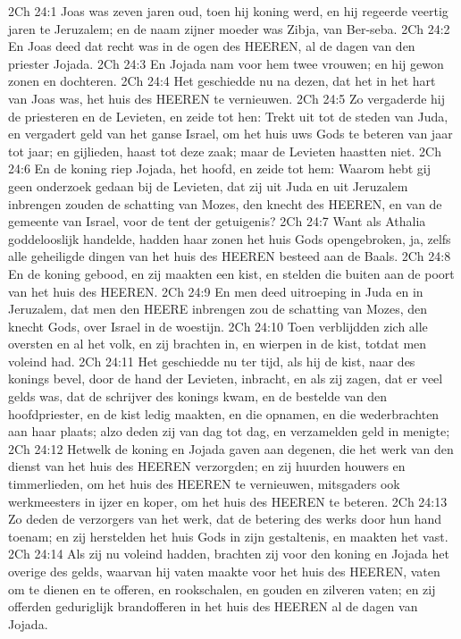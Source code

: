 2Ch 24:1  Joas was zeven jaren oud, toen hij koning werd, en hij regeerde veertig jaren te Jeruzalem; en de naam zijner moeder was Zibja, van Ber-seba.
2Ch 24:2  En Joas deed dat recht was in de ogen des HEEREN, al de dagen van den priester Jojada.
2Ch 24:3  En Jojada nam voor hem twee vrouwen; en hij gewon zonen en dochteren.
2Ch 24:4  Het geschiedde nu na dezen, dat het in het hart van Joas was, het huis des HEEREN te vernieuwen.
2Ch 24:5  Zo vergaderde hij de priesteren en de Levieten, en zeide tot hen: Trekt uit tot de steden van Juda, en vergadert geld van het ganse Israel, om het huis uws Gods te beteren van jaar tot jaar; en gijlieden, haast tot deze zaak; maar de Levieten haastten niet.
2Ch 24:6  En de koning riep Jojada, het hoofd, en zeide tot hem: Waarom hebt gij geen onderzoek gedaan bij de Levieten, dat zij uit Juda en uit Jeruzalem inbrengen zouden de schatting van Mozes, den knecht des HEEREN, en van de gemeente van Israel, voor de tent der getuigenis?
2Ch 24:7  Want als Athalia goddelooslijk handelde, hadden haar zonen het huis Gods opengebroken, ja, zelfs alle geheiligde dingen van het huis des HEEREN besteed aan de Baals.
2Ch 24:8  En de koning gebood, en zij maakten een kist, en stelden die buiten aan de poort van het huis des HEEREN.
2Ch 24:9  En men deed uitroeping in Juda en in Jeruzalem, dat men den HEERE inbrengen zou de schatting van Mozes, den knecht Gods, over Israel in de woestijn.
2Ch 24:10  Toen verblijdden zich alle oversten en al het volk, en zij brachten in, en wierpen in de kist, totdat men voleind had.
2Ch 24:11  Het geschiedde nu ter tijd, als hij de kist, naar des konings bevel, door de hand der Levieten, inbracht, en als zij zagen, dat er veel gelds was, dat de schrijver des konings kwam, en de bestelde van den hoofdpriester, en de kist ledig maakten, en die opnamen, en die wederbrachten aan haar plaats; alzo deden zij van dag tot dag, en verzamelden geld in menigte;
2Ch 24:12  Hetwelk de koning en Jojada gaven aan degenen, die het werk van den dienst van het huis des HEEREN verzorgden; en zij huurden houwers en timmerlieden, om het huis des HEEREN te vernieuwen, mitsgaders ook werkmeesters in ijzer en koper, om het huis des HEEREN te beteren.
2Ch 24:13  Zo deden de verzorgers van het werk, dat de betering des werks door hun hand toenam; en zij herstelden het huis Gods in zijn gestaltenis, en maakten het vast.
2Ch 24:14  Als zij nu voleind hadden, brachten zij voor den koning en Jojada het overige des gelds, waarvan hij vaten maakte voor het huis des HEEREN, vaten om te dienen en te offeren, en rookschalen, en gouden en zilveren vaten; en zij offerden geduriglijk brandofferen in het huis des HEEREN al de dagen van Jojada.
